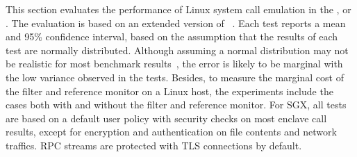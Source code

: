 This section evaluates the performance
of Linux system call emulation
in the \graphene{} \libos{}, or \thelibos{}.
The evaluation is based on
an extended version of \lmbenchwithver{}~\cite{McVoy:lmbench}.
Each \lmbench{} test
reports a mean and 95\% confidence interval,
based on the assumption
that the results of each test are normally distributed.
Although assuming a normal distribution may not be realistic for most benchmark results~\cite{staelin05lmbench},
the error is likely to be marginal with the low variance
observed in the tests.
Besides, to measure the marginal cost of the \seccomp{} filter and reference monitor on a Linux host,
the experiments include the cases both with
and without the \seccomp{} filter and reference monitor.
For SGX, all tests
are based on a default user policy with security checks on most enclave call results,
except for encryption and authentication
on file contents and
network traffics.
RPC streams are protected with TLS connections by default.


